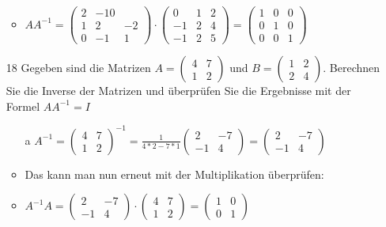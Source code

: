 \documentclass{article}
\begin{document}
\begin{itemize}
		\begin{itemize}
			\item{$AA^{-1}=\begin{pmatrix} 2 & -1 0 \\ 1 & 2 & -2 \\ 0 & -1 & 1 \end{pmatrix}\cdot \begin{pmatrix} 0 & 1 & 2 \\ -1 & 2 & 4 \\ -1 & 2 & 5 \end{pmatrix}=\begin{pmatrix} 1 & 0 & 0 \\ 0 & 1 & 0 \\ 0 & 0 & 1 \end{pmatrix}$}
		\end{itemize}
		\item[18]{Gegeben sind die Matrizen $A=\begin{pmatrix} 4 & 7 \\ 1 & 2 \end{pmatrix}$ und $B=\begin{pmatrix} 1 & 2 \\ 2 & 4 \end{pmatrix}$. Berechnen Sie die Inverse der Matrizen und überprüfen Sie die Ergebnisse mit der Formel $AA^{-1}=I$}
		\begin{itemize}
			\item[a]{$A^{-1}=\begin{pmatrix} 4 & 7 \\ 1 & 2 \end{pmatrix}^{-1}=\frac{1}{4*2-7*1}\begin{pmatrix} 2 & -7 \\ -1 & 4 \end{pmatrix}=\begin{pmatrix} 2 & -7 \\ -1 & 4 \end{pmatrix}$}
			\item{Das kann man nun erneut mit der Multiplikation überprüfen:}
			\item{$A^{-1}A=\begin{pmatrix} 2 & -7 \\ -1 & 4 \end{pmatrix}\cdot \begin{pmatrix} 4 & 7 \\ 1 & 2 \end{pmatrix}=\begin{pmatrix} 1 & 0 \\ 0 & 1 \end{pmatrix}$}

\end{itemize}
\end{itemize}
\end{document}
